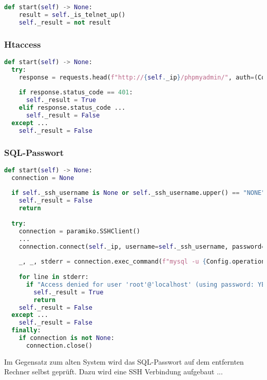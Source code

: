 \begin{lstlisting}[language=Python, frame=single, caption={Big Brother Telnet}, captionpos=b, label={lst:bigbrother-telnet}]
def start(self) -> None:
	result = self._is_telnet_up()
	self._result = not result
\end{lstlisting}

\subsubsection{Htaccess}

\begin{lstlisting}[language=Python, frame=single, caption={Big Brother Htaccess}, captionpos=b, label={lst:bigbrother-htaccess}]
def start(self) -> None:
  try:
    response = requests.head(f"http://{self._ip}/phpmyadmin/", auth=(Config.operations['htaccess']['username'], Config.operations['htaccess']['password']))
    
    if response.status_code == 401:
      self._result = True
    elif response.status_code ...
      self._result = False
  except ...
    self._result = False
\end{lstlisting}

\subsubsection{SQL-Passwort}

\begin{lstlisting}[language=Python, frame=single, caption={Big Brother SQL-Passwort}, captionpos=b, label={lst:bigbrother-sql-password}]
def start(self) -> None:
  connection = None
  
  if self._ssh_username is None or self._ssh_username.upper() == "NONE" or self._ssh_password is None or self._ssh_password.upper() == "NONE":
    self._result = False
    return
  
  try:
    connection = paramiko.SSHClient()
    ...
    connection.connect(self._ip, username=self._ssh_username, password=self._ssh_password, timeout=Config.operations['base']['ssh_timeout'])
    
    _, _, stderr = connection.exec_command(f"mysql -u {Config.operations['sql']['username']} -p{Config.operations['sql']['password']} -e 'quit'")
    
    for line in stderr:
      if "Access denied for user 'root'@'localhost' (using password: YES)" in line.strip('\n'):
        self._result = True
        return
    self._result = False
  except ...
    self._result = False
  finally:
    if connection is not None:
      connection.close()
\end{lstlisting}
Im Gegensatz zum alten System wird das SQL-Passwort auf dem entfernten Rechner selbst geprüft.
Dazu wird eine SSH Verbindung aufgebaut ...


